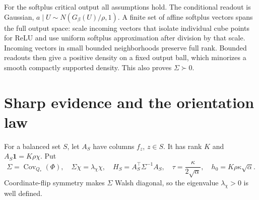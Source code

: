 \documentclass[11pt]{article}
\newcommand{\one}{\mathbf1}\newcommand{\TV}{\mathrm{TV}}
\begin{document}
For the softplus critical output all assumptions hold. The conditional
readout is Gaussian, $a\mid U\sim N(G_\beta(U)/\rho,1)$. A finite set
of affine softplus vectors spans the full output space: scale incoming
vectors that isolate individual cube points for ReLU and use uniform
softplus approximation after division by that scale. Incoming vectors
in small bounded neighborhoods preserve full rank. Bounded readouts
then give a positive density on a fixed output ball, which minorizes a
smooth compactly supported density. This also proves $\Sigma\succ0$.

\section{Sharp evidence and the orientation law}
For a balanced set $S$, let $A_S$ have columns $f_z$, $z\in S$.
It has rank $K$ and $A_S\one=K\rho\chi$. Put
\[
 \Sigma=\operatorname{Cov}_{Q_*}(\Phi),\quad
 \Sigma\chi=\lambda_\chi\chi,\quad
 H_S=A_S^\top\Sigma^{-1}A_S,\quad
 \tau=\frac\kappa{2\sqrt\alpha},\quad
 h_0=K\rho\kappa\sqrt\alpha.
 \tag{14}
\]
Coordinate-flip symmetry makes $\Sigma$ Walsh diagonal, so the eigenvalue
$\lambda_\chi>0$ is well defined.
\end{document}
